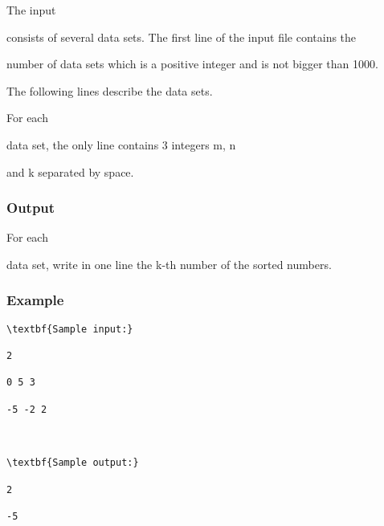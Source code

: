   The input 

  consists of several data sets. The first line of the input file contains the 

  number of data sets which is a positive integer and is not bigger than 1000. 

  The following lines describe the data sets. 



  For each 

  data set, the only line contains 3 integers m, n 

  and k separated by space. 

\subsubsection{Output}



  For each 

  data set, write in one line the k-th number of the sorted numbers. 

  

\subsubsection{Example}


\begin{verbatim}
\textbf{Sample input:}

2

0 5 3

-5 -2 2



\textbf{Sample output:}

2

-5 

\end{verbatim}
